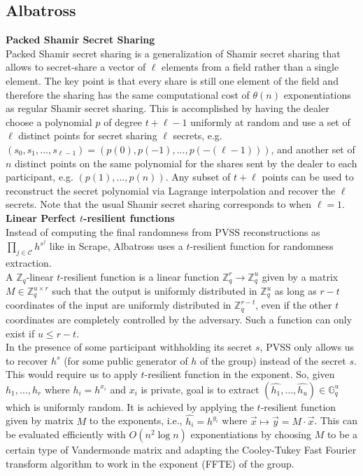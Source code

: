 \documentclass[letterpaper,twocolumn,10pt]{article}
\theoremstyle{definition}
\theoremstyle{remark}
\begin{document}
\subsection {Albatross}
\label{appendix:albatross}

\noindent\textbf{Packed Shamir Secret Sharing} \\
Packed Shamir secret sharing is a generalization of Shamir secret sharing that allows to secret-share a vector of $\ell$ elements from a field rather than a single element. The key point is that every share is still one element of the field and therefore the sharing has the same computational cost of $\theta(n)$ exponentiations as regular Shamir secret sharing. This is accomplished by having the dealer choose a polynomial $p$ of degree $t+\ell-1$ uniformly at random and use a set of $\ell$ distinct points for secret sharing $\ell$ secrets, e.g. $(s_0, s_1, ..., s_{\ell - 1}) = (p(0), p(-1), ..., p(-(\ell - 1)))$, and another set of $n$ distinct points on the same polynomial for the shares sent by the dealer to each participant, e.g. $(p(1), ..., p(n))$. Any subset of $t+\ell$ points can be used to reconstruct the secret polynomial via Lagrange interpolation and recover the $\ell$ secrets. Note that the usual Shamir secret sharing corresponds to when $\ell = 1$.\\

\noindent\textbf{Linear Perfect $t$-resilient functions}\\
Instead of computing the final randomness from PVSS reconstructions as $\prod_{j \in \mathcal{C}} h^{s^j}$ like in Scrape, Albatross uses a $t$-resilient function for randomness extraction.\\
A $\mathbb{Z}_q$-linear $t$-resilient function is a linear function $\mathbb{Z}_q^r \rightarrow \mathbb{Z}_q^u$ given by a matrix $M \in \mathbb{Z}_q^{u \times r}$ such that the output is uniformly distributed in  $\mathbb{Z}_q^u$ as long as $r-t$ coordinates of the input are uniformly distributed in  $\mathbb{Z}_q^{r-t}$, even if the other $t$ coordinates are completely controlled by the adversary. Such a function can only exist if $u \le r-t$.\\
In the presence of some participant withholding its secret $s$, PVSS only allows us to recover $h^s$ (for some public generator of $h$ of the group) instead of the secret $s$. This would require us to apply $t$-resilient function in the exponent. So, given $h_1, \ldots, h_r$ where $h_i = h^{x_i}$ and $x_i$ is private,  goal is to extract $(\hat{h_1},\ldots, \hat{h_u}) \in \mathbb{G}_q^u$ which is uniformly random. It is achieved by applying the $t$-resilient function given by matrix $M$ to the exponents, i.e., $\hat{h_i} = h^{y_i}$ where $\vec{x} \mapsto \vec{y} = M \cdot \vec{x}$. This can be evaluated efficiently with $O(n^2 \log n)$ exponentiations by choosing $M$ to be a certain type of Vandermonde matrix and adapting the Cooley-Tukey Fast Fourier transform algorithm to work in the exponent (FFTE) \cite{cascudo2020albatross} of the group.\\
\end{document}
